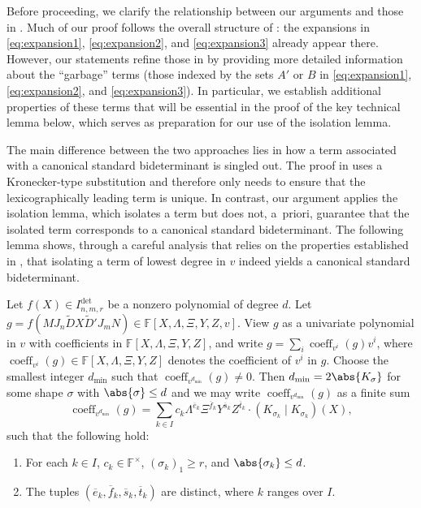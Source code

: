 \documentclass[10pt,a4paper]{amsart}
\newcommand*\apriori{a~priori}
\DeclareMathOperator{\coeff}{coeff}
\newcommand*\F{\mathbb{F}}
\begin{document}
Before proceeding, we clarify the relationship between our arguments and those in \cite{AF21}.
Much of our proof follows the overall structure of \cite{AF21}: the expansions in \eqref{eq:expansion1}, \eqref{eq:expansion2}, and \eqref{eq:expansion3} already appear there.
However, our statements refine those in \cite{AF21} by providing more detailed information about the ``garbage'' terms (those indexed by the sets $A'$ or $B$ in \eqref{eq:expansion1}, \eqref{eq:expansion2}, and \eqref{eq:expansion3}). In particular, we establish additional properties of these terms that will be essential in the proof of the key technical lemma below, which serves as preparation for our use of the isolation lemma. 

The main difference between the two approaches lies in how a term associated with a canonical standard bideterminant is singled out.
The proof in \cite{AF21} uses a Kronecker-type substitution and therefore only needs to ensure that the lexicographically leading term is unique.
In contrast, our argument applies the isolation lemma, which isolates a term but does not, \apriori, guarantee that the isolated term corresponds to a canonical standard bideterminant.
The following lemma shows, through a careful analysis that relies on the properties established in , that isolating a term of lowest degree in $v$ indeed yields a canonical standard bideterminant.

\begin{lem}\label{lem:key}
Let $f(X) \in I^{\det}_{n, m, r}$ be a nonzero polynomial of degree $d$.
Let $g = f(M J_n \widetilde{D} X \widetilde{D}' J_m N) \in \F[X, \Lambda, \Xi, Y, Z, v]$.
View $g$ as a univariate polynomial in $v$ with coefficients in $\F[X,\Lambda,\Xi,Y,Z]$, and write $g=\sum_{i} \coeff_{v^i}(g) v^i$, where $\coeff_{v^i}(g)\in \F[X,\Lambda,\Xi,Y,Z]$ denotes the coefficient of $v^i$ in $g$.
Choose the smallest integer $d_{\min}$ such that  $\coeff_{v^{d_{\min}}}(g)\neq 0$.
Then $d_{\min}=2 \abs{K_\sigma}$ for some shape $\sigma$ with $\abs{\sigma} \leq d$ and we may write $\coeff_{v^{d_{\min}}}(g)$ as a finite sum
\begin{equation}\label{eq:required}
    \coeff_{v^{d_{\min}}}(g)=\sum_{k\in I} c_k \Lambda^{\overline{e}_k}\Xi^{\overline{f}_k}Y^{\overline{s}_k}Z^{\overline{t}_k}\cdot (K_{\sigma_k}\mid K_{\sigma_k})(X), 
\end{equation}
such that the following hold:
\begin{enumerate}
    \item\label{item:required1} For each $k\in I$, $c_k\in\F^\times$,  $(\sigma_k)_1\geq r$, and $\abs{\sigma_k} \leq d$.
    \item\label{item:required2} The tuples $(\overline{e}_k,\overline{f}_k, \overline{s}_k,\overline{t}_k)$ are distinct, where $k$ ranges over $I$.
\end{enumerate}
\end{lem}
\end{document}
